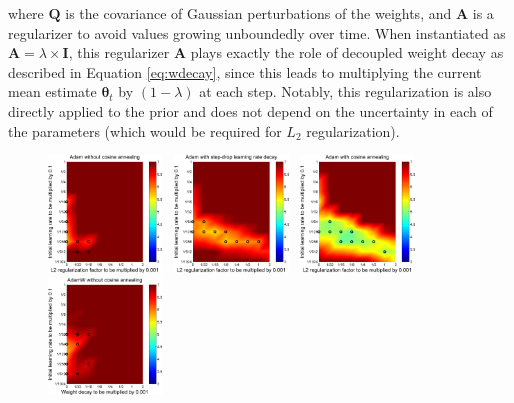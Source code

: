 \documentclass[usenames,dvipsnames]{article} %
\begin{document}
where $\bm{Q}$ is the covariance of Gaussian perturbations of the weights, and $\bm{A}$ is a regularizer to avoid values growing unboundedly over time. When instantiated as $\bm{A} = \lambda\times \bm{I}$, this regularizer $\bm{A}$ plays exactly the role of decoupled weight decay as described in Equation \ref{eq:wdecay}, since this leads to multiplying the current mean estimate $\bm{\theta}_t$ by $(1-\lambda)$ at each step. Notably, this regularization is also directly applied to the prior and does not depend on the uncertainty in each of the parameters (which would be required for $L_2$ regularization).


\begin{figure}[t]%
\begin{center}
  \includegraphics[width=0.27\textwidth]{fig1_ADAMwithoutcosine.pdf}~
    \includegraphics[width=0.27\textwidth]{suppfig2_ADAMwithstepdrop.pdf}~
  \includegraphics[width=0.27\textwidth]{fig1_ADAMwithcosine.pdf}~\\
  \includegraphics[width=0.27\textwidth]{mADAMwithoutcosine.pdf}~

\end{center}
\end{figure}
\end{document}
